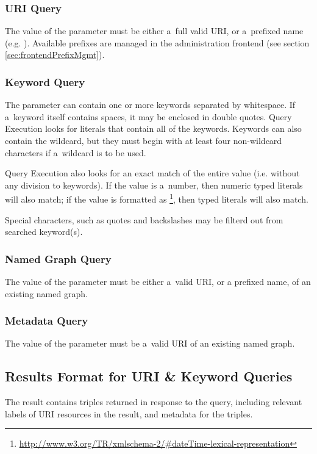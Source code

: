 \subsubsection{URI Query}
The value of the  parameter must be either a~full valid URI, or a~prefixed name (e.g. ).  Available prefixes are managed in the administration frontend (see section \ref{sec:frontendPrefixMgmt}).

\subsubsection{Keyword Query}
The  parameter can contain one or more keywords separated by whitespace. If a~keyword itself contains spaces, it may be enclosed in double quotes. Query Execution looks for literals that contain all of the keywords. Keywords can also contain the \code{*} wildcard, but they must begin with at least four non-wildcard characters if a~wildcard is to be used.

Query Execution also looks for an exact match of the entire  value (i.e. without any division to keywords). If the  value is a~number, then numeric typed literals will also match; if the  value is formatted as \footnote{\url{http://www.w3.org/TR/xmlschema-2/\#dateTime-lexical-representation}}, then  typed literals will also match.

Special characters, such as quotes and backslashes may be filterd out from searched keyword(s).

\subsubsection{Named Graph Query}
The value of the  parameter must be either a~valid URI, or a prefixed name, of an existing named graph.

\subsubsection{Metadata Query}
The value of the  parameter must be a~valid URI of an existing named graph.

\subsection{Results Format for URI \& Keyword Queries}
\label{sec:URIKWResultsFormat}

The result contains triples returned in response to the query, including relevant labels of URI resources in the result, and metadata for the triples.

